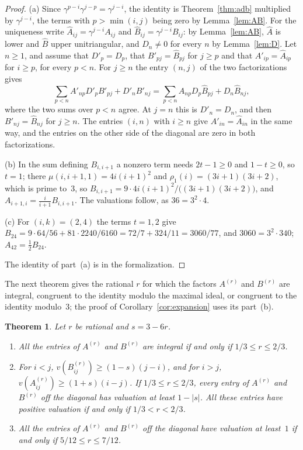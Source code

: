\documentclass[11pt]{amsart}
\newtheorem{theorem}{Theorem}[section]
\theoremstyle{definition}
\numberwithin{equation}{section}
\newcommand{\lean}[1]{\ignorespaces}
\begin{document}
\begin{proof}
(a) Since $\gamma^{p-i}\gamma^{j-p}=\gamma^{j-i}$, the identity is Theorem~\ref{thm:adb} multiplied by $\gamma^{j-i}$, the terms with $p>\min(i,j)$ being zero by Lemma~\ref{lem:AB}. For the uniqueness write $\hat A_{ij}=\gamma^{j-i}A_{ij}$ and $\hat B_{ij}=\gamma^{j-i}B_{ij}$: by Lemma~\ref{lem:AB}, $\hat A$ is lower and $\hat B$ upper unitriangular, and $D_n\ne0$ for every $n$ by Lemma~\ref{lem:D}. Let $n\ge1$, and assume that $D'_p=D_p$, that $B'_{pj}=\hat B_{pj}$ for $j\ge p$ and that $A'_{ip}=\hat A_{ip}$ for $i\ge p$, for every $p<n$. For $j\ge n$ the entry $(n,j)$ of the two factorizations gives
\[
\sum_{p<n}A'_{np}D'_pB'_{pj}+D'_nB'_{nj}=\sum_{p<n}\hat A_{np}D_p\hat B_{pj}+D_n\hat B_{nj},
\]
where the two sums over $p<n$ agree. At $j=n$ this is $D'_n=D_n$, and then $B'_{nj}=\hat B_{nj}$ for $j\ge n$. The entries $(i,n)$ with $i\ge n$ give $A'_{in}=\hat A_{in}$ in the same way, and the entries on the other side of the diagonal are zero in both factorizations.

(b) In the sum defining $B_{i,i+1}$ a nonzero term needs $2t-1\ge0$ and $1-t\ge0$, so $t=1$; there $\mu(i,i+1,1)=4i(i+1)^2$ and $\rho_1(i)=(3i+1)(3i+2)$, which is prime to~$3$, so $B_{i,i+1}=9\cdot4i(i+1)^2/\bigl((3i+1)(3i+2)\bigr)$, and $A_{i+1,i}=\frac{i}{i+1}B_{i,i+1}$. The valuations follow, as $36=3^2\cdot4$.

(c) For $(i,k)=(2,4)$ the terms $t=1,2$ give $B_{24}=9\cdot64/56+81\cdot2240/6160=72/7+324/11=3060/77$, and $3060=3^2\cdot340$; $A_{42}=\frac12B_{24}$.

The identity of part~(a) is  in the formalization.
\end{proof}

The next theorem gives the rational $r$ for which the factors $A^{(r)}$ and $B^{(r)}$ are integral, congruent to the identity modulo the maximal ideal, or congruent to the identity modulo~$3$; the proof of Corollary~\ref{cor:expansion} uses its part~(b).

\begin{theorem}\label{thm:loeffler}\lean{CalegariSlopes.Conj5.integral_iff, CalegariSlopes.Conj5.valuation_B_ge, CalegariSlopes.Conj5.valuation_A_ge, CalegariSlopes.Conj5.valuation_uniform, CalegariSlopes.Conj5.congr_maximal_iff, CalegariSlopes.Conj5.congr_three_iff, CalegariSlopes.Conj5.padicValRat_B_ge, CalegariSlopes.Conj5.padicValRat_A_ge}
Let $r$ be rational and $s=3-6r$.
\begin{enumerate}
\item[(a)] All the entries of $A^{(r)}$ and $B^{(r)}$ are integral if and only if $1/3\le r\le2/3$.
\item[(b)] For $i<j$, $v(B^{(r)}_{ij})\ge(1-s)(j-i)$, and for $i>j$, $v(A^{(r)}_{ij})\ge(1+s)(i-j)$. If $1/3\le r\le2/3$, every entry of $A^{(r)}$ and $B^{(r)}$ off the diagonal has valuation at least $1-|s|$. All these entries have positive valuation if and only if $1/3<r<2/3$.
\item[(c)] All the entries of $A^{(r)}$ and $B^{(r)}$ off the diagonal have valuation at least~$1$ if and only if $5/12\le r\le7/12$.
\end{enumerate}
\end{theorem}
\end{document}
